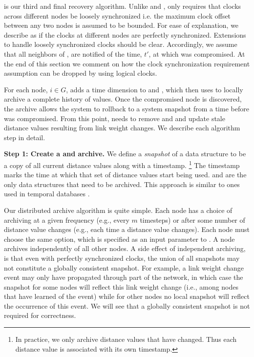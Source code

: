 is our third and final recovery algorithm. 
Unlike \second and \purges, \cpr only requires that clocks across different
nodes be loosely synchronized i.e. the maximum clock offset between
any two nodes is assumed to be  bounded. For ease of explanation, we
describe \cpr as if the clocks at different nodes are perfectly
synchronized. Extensions to handle loosely synchronized clocks should
be clear. Accordingly, we assume that all neighbors of \bads, are
notified of the time, $t'$, at which \bad was compromised.  At the end of this section we comment on how the clock synchronization requirement assumption can be dropped by
using logical clocks.

For each node, $i \in G$, \cpr adds a time dimension to \minvi and \dmatrixis, which \cpr then uses to locally archive a complete history of values. 
Once the compromised node is discovered, 
the archive allows the system to rollback to 
a system snapshot from a time before \bad was compromised. From this point, \cpr needs to remove \bad and \oldvector and update stale distance values resulting from link weight changes.
We describe each algorithm step in detail. %

{\bf Step 1: Create a \minv and \dmatrix archive.} 
	We define a  \emph{snapshot} of a data structure to be a copy of all current distance values along with a timestamp.
	{\footnote {\small In practice, we only archive distance values that have changed. Thus each distance value is associated with its own timestamp.}}
	The timestamp marks the time at which that set of distance values start being used. 
	\minv and \dmatrix are the only data structures that need to be archived. This approach is similar to ones used in temporal databases 
  \cite{Jensen91,Lomet06}.

  Our distributed archive algorithm is quite simple.  %
	Each node has a choice of archiving at a given frequency (e.g., every $m$ timesteps) or after some number of distance value changes (e.g., each time a distance 
	value changes).  Each node must choose the same option, which is specified as an input parameter to \cprs. A node archives independently of all other nodes.
  A side effect of independent archiving, is that even with perfectly synchronized clocks, the union of all snapshots may not constitute a globally consistent snapshot. 
  For example, a link weight change event may only have propagated 
  through part of the network, in which case the snapshot for some nodes will reflect this link weight change (i.e., among nodes that have learned of the event) 
  while for other nodes no local snapshot will reflect the occurrence of this event. We will see that a globally consistent snapshot is not required for correctness.  

